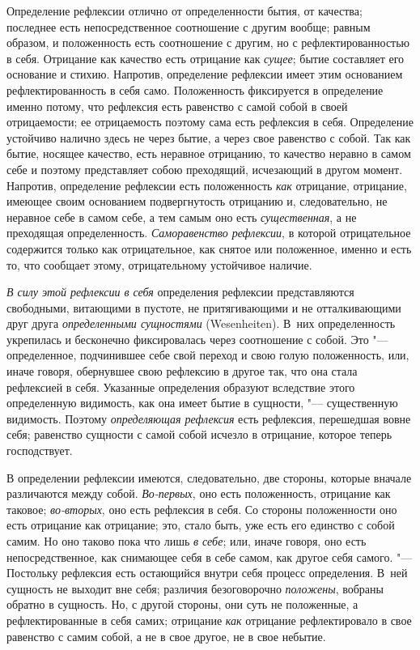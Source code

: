 Определение рефлексии отлично от определенности бытия, от качества;
последнее есть непосредственное соотношение с другим вообще; равным
образом, и положенность есть соотношение с другим, но с рефлектированностью
в себя. Отрицание как качество есть отрицание как
{\em сущее}; бытие составляет его основание и стихию.
Напротив, определение рефлексии имеет этим основанием рефлектированность в
себя само. Положенность фиксируется в определение именно потому, что
рефлексия есть равенство с самой собой в своей отрицаемости; ее
отрицаемость поэтому сама есть рефлексия в себя. Определение устойчиво
налично здесь не через бытие, а через свое равенство с собой. Так как
бытие, носящее качество, есть неравное отрицанию, то качество неравно в
самом себе и поэтому представляет собою преходящий, исчезающий в другом
момент. Напротив, определение рефлексии есть положенность
{\em как} отрицание, отрицание, имеющее своим
основанием подвергнутость отрицанию и, следовательно, не неравное себе в
самом себе, а тем самым оно есть {\em существенная}, а
не преходящая определенность. {\em Саморавенство
рефлексии}, в которой отрицательное содержится только как отрицательное,
как снятое или положенное, именно и есть то, что сообщает этому,
отрицательному устойчивое наличие.

{\em В силу этой рефлексии в себя} определения рефлексии
представляются свободными, витающими в пустоте, не притягивающими и не
отталкивающими друг друга {\em определенными
сущностями} (Wesenheiten). В~них определенность укрепилась и бесконечно
фиксировалась через соотношение с собой. Это "--- определенное, подчинившее
себе свой переход и свою голую положенность, или, иначе говоря, обернувшее
свою рефлексию в другое так, что она стала рефлексией в себя. Указанные
определения образуют вследствие этого определенную видимость, как она имеет
бытие в сущности, "--- существенную видимость. Поэтому
{\em определяющая рефлексия} есть рефлексия, перешедшая
вовне себя; равенство сущности с самой собой исчезло в отрицание, которое
теперь господствует.

В определении рефлексии имеются, следовательно, две стороны, которые вначале
различаются между собой. {\em Во-первых}, оно есть
положенность, отрицание как таковое; {\em во-вторых},
оно есть рефлексия в себя. Со стороны положенности оно есть отрицание как
отрицание; это, стало быть, уже есть его единство с собой самим. Но оно
таково пока что лишь {\em в себе}; или, иначе говоря,
оно есть непосредственное, как снимающее себя в себе самом, как другое себя
самого. "--- Постольку рефлексия есть остающийся внутри себя процесс
определения. В~ней сущность не выходит вне себя; различия безоговорочно
{\em положены}, вобраны обратно в сущность. Но, с
другой стороны, они суть не положенные, а рефлектированные в себя самих;
отрицание {\em как} отрицание рефлектировало в свое
равенство с самим собой, а не в свое другое, не в свое небытие.


